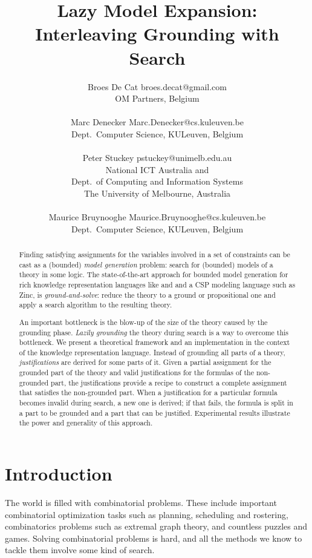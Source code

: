 \documentclass[11pt]{article}
\title{Lazy Model Expansion:\\ Interleaving Grounding with Search}
\author{\name Broes De Cat \email broes.decat@gmail.com\\
		\addr OM Partners, Belgium \\ \\
         \name Marc Denecker \email Marc.Denecker@cs.kuleuven.be\\
         \addr Dept.\ Computer Science, KULeuven, Belgium\\ \\
        \name  Peter Stuckey \email pstuckey@unimelb.edu.au\\
        \addr National ICT Australia and \\
        \addr Dept.\ of Computing and Information Systems\\
        \addr The University of Melbourne,  Australia \\ \\
       \name Maurice Bruynooghe \email Maurice.Bruynooghe@cs.kuleuven.be\\
       \addr Dept.\ Computer Science, KULeuven, Belgium
      }
\newcommand{\logicname}[1]{\text{\sc #1}\xspace}
\newcommand{\fodot}{\logicname{FO(\ensuremath{\cdot})}}
\theoremstyle{plain}
\theoremstyle{definition}
\theoremstyle{example_basic}
\theoremstyle{example_contd}
\theoremstyle{plain}
\newcommand{\change}[1]{#1}
\begin{document}
\maketitle

\begin{abstract}
Finding satisfying assignments for the variables involved in a set of constraints can be cast as a (bounded) \emph{model generation} problem: search for (bounded) models of a theory in some logic.
The state-of-the-art approach for bounded model generation for rich
knowledge representation languages like \ASP and \fodot and \change{a
  CSP modeling language such as} Zinc, is \emph{ground-and-solve}: reduce the theory to a ground or propositional one and apply a search algorithm to the resulting theory.

An important bottleneck is the blow-up of the size of the theory caused by the \change{grounding} phase. \emph{Lazily grounding} the theory during search is a way to overcome this bottleneck. We present a theore\-tical framework and an implementation in the context of the \fodot knowledge representation language.
Instead of grounding all parts of a theory, {\em justifications} are derived for some parts of it. Given a partial assignment for the grounded part of the theory and valid justifications for the formulas of the non-grounded part, the justifications provide a recipe to construct a complete assignment that satisfies the non-grounded part. When a justification for a particular formula becomes invalid during search, a new one is derived; if that fails, the formula is split in a part to be grounded and a part that can be justified. Experimental results illustrate the power and generality of this approach.
\end{abstract}

\section{Introduction}\label{sec:intro}

\change{The world is filled with combinatorial problems. These include important combinatorial optimization tasks such as planning, scheduling and rostering, combinatorics problems such as extremal graph theory, and countless puzzles and games. Solving combinatorial problems is hard, and all the methods we know to tackle them involve some kind of search.}
\end{document}
